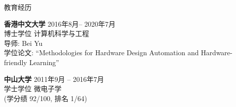 \begin{rSection}{教育经历}

{\bf 香港中文大学} \hfill { 2016年8月-- 2020年7月}\\
博士学位 \quad 计算机科学与工程 \\
导师: Bei Yu \\
学位论文: ``Methodologies for Hardware Design Automation and Hardware-friendly Learning''

{\bf 中山大学} \hfill { 2011年9月 -- 2016年7月}\\
学士学位 \quad 微电子学 \\
(学分绩 92/100, 排名 1/64) 
\end{rSection}
